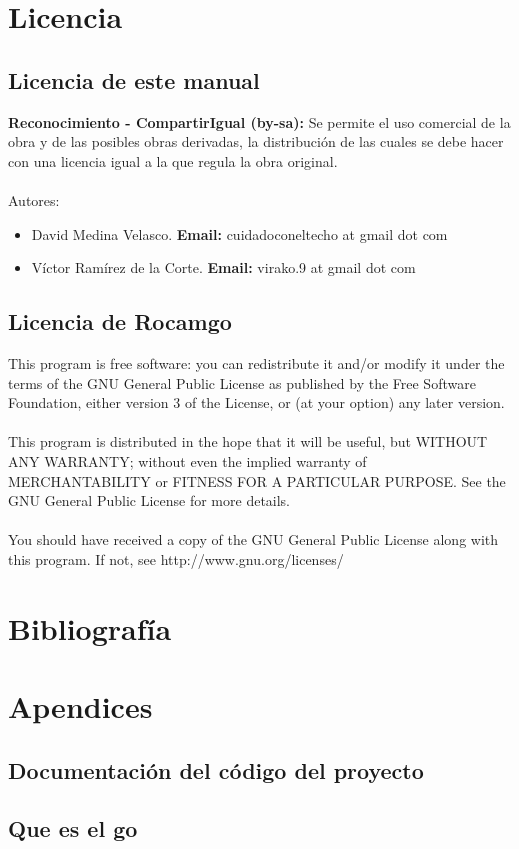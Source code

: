 \documentclass[12pt,a4paper]{report}
\begin{document}
\chapter{Licencia}

\section{Licencia de este manual}

\textbf{Reconocimiento - CompartirIgual (by-sa):} Se permite el uso comercial de
la obra y de las posibles obras derivadas, la distribución de las cuales se debe
hacer con una licencia igual a la que regula la obra original. \\ \\


Autores: \begin{itemize} \item David Medina Velasco. \textbf{Email:}
cuidadoconeltecho at gmail dot com \item Víctor Ramírez de la Corte.
\textbf{Email:} virako.9 at gmail dot com \end{itemize}

\section{Licencia de Rocamgo}

This program is free software: you can redistribute it and/or modify it under
the terms of the GNU General Public License as published by the Free Software
Foundation, either version 3 of the License, or (at your option) any later
version. \\ \\ This program is distributed in the hope that it will be useful,
but WITHOUT ANY WARRANTY; without even the implied warranty of MERCHANTABILITY
or FITNESS FOR A PARTICULAR PURPOSE.  See the GNU General Public License for
more details. \\ \\ You should have received a copy of the GNU General Public
License along with this program.  If not, see http://www.gnu.org/licenses/



\chapter{Bibliografía}


\chapter{Apendices} \section{Documentación del código del proyecto} \section{Que
es el go} 
\end{document}
